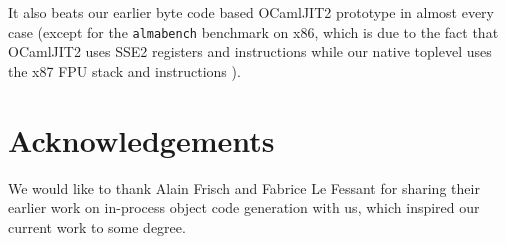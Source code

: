 \documentclass[10pt,a4paper,draft,twocolumn]{article}
\begin{document}
It also beats our earlier byte code based OCamlJIT2 prototype in almost every case (except for the
\texttt{almabench} benchmark on x86, which is due to the fact that OCamlJIT2 uses SSE2 registers and
instructions while our native toplevel uses the x87 FPU stack and instructions \cite{Meurer10jit}).


\section*{Acknowledgements} \label{section:Acknowledgements}

We would like to thank Alain Frisch and Fabrice Le Fessant for sharing their earlier work on
in-process object code generation with us, which inspired our current work to some degree.




\end{document}
